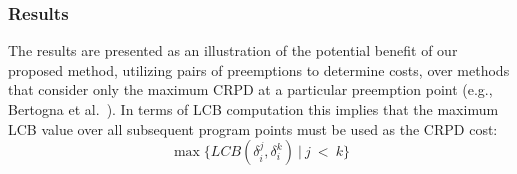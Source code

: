 \subsubsection{Results}
The results are presented as an illustration of the potential benefit of our proposed method, utilizing pairs of preemptions to determine costs, over methods that consider only the maximum CRPD at a particular preemption point (e.g., Bertogna et al.~\cite{bertogna:11}).  
In terms of LCB computation this implies that the maximum LCB value over all subsequent program points must be used as the CRPD cost:
\begin{equation}
  \max\{LCB(\delta_i^j,\delta_i^k)\ \vert\ j\ <\ k\}
\end{equation}
%

